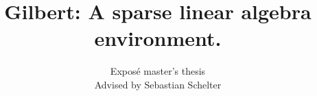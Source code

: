 \documentclass{dima}
\begin{document}

\title{Gilbert: A sparse linear algebra environment.}
\subtitle{Exposé master's thesis\\Advised by Sebastian Schelter}


%
%
%
%


\author{
%
%
}
\end{document}
